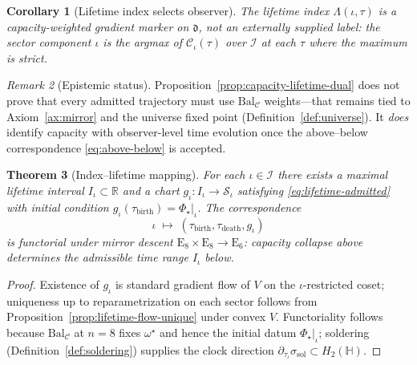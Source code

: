 \documentclass[aps,prd,onecolumn,amsmath,amssymb,nofootinbib,11pt]{revtex4-2}
\numberwithin{equation}{section}
\theoremstyle{plain}
\newtheorem{theorem}{Theorem}[section]
\newtheorem{corollary}[theorem]{Corollary}
\theoremstyle{definition}
\theoremstyle{remark}
\newtheorem{remark}[theorem]{Remark}
\newcommand{\Quat}{\mathbb{H}}
\newcommand{\E}[1]{\mathrm{E}_{#1}}
\newcommand{\capacity}{\mathcal{C}}
\newcommand{\orderparam}{\Phi}
\begin{document}
\begin{corollary}[Lifetime index selects observer]\label{cor:iota-lambda}
The lifetime index $\Lambda(\iota,\tau)$ is a capacity-weighted gradient marker
on $\mathfrak{d}$, not an externally supplied label: the sector component
$\iota$ is the argmax of $\capacity_\iota(\tau)$ over $\mathcal{I}$ at each
$\tau$ where the maximum is strict.
\end{corollary}

\begin{remark}[Epistemic status]
Proposition~\ref{prop:capacity-lifetime-dual} does not prove that every
admitted trajectory must use $\mathrm{Bal}_{\mathcal{C}}$ weights---that
remains tied to Axiom~\ref{ax:mirror} and the universe fixed point
(Definition~\ref{def:universe}). It \emph{does} identify capacity with
observer-level time evolution once the above--below correspondence
\eqref{eq:above-below} is accepted.
\end{remark}

\begin{theorem}[Index--lifetime mapping]\label{thm:index-lifetime}
For each $\iota\in\mathcal{I}$ there exists a maximal lifetime interval
$I_\iota\subset\mathbb{R}$ and a chart $g_\iota:I_\iota\to\mathcal{S}_\iota$
satisfying \eqref{eq:lifetime-admitted} with initial condition
$g_\iota(\tau_{\mathrm{birth}})=\orderparam_\star|_\iota$.
The correspondence
\begin{equation}\label{eq:index-lifetime-bij}
  \iota \;\longmapsto\; (\tau_\mathrm{birth},\tau_\mathrm{death},g_\iota)
\end{equation}
is functorial under mirror descent $\E{8}\times\E{8}\to\E{6}$: capacity
collapse above determines the admissible time range $I_\iota$ below.
\end{theorem}

\begin{proof}
Existence of $g_\iota$ is standard gradient flow of $V$ on the
$\iota$-restricted coset; uniqueness up to reparametrization on each sector
follows from Proposition~\ref{prop:lifetime-flow-unique} under convex $V$.
Functoriality follows because
$\mathrm{Bal}_{\mathcal{C}}$ at $n=8$ fixes $\omega^\star$ and hence the
initial datum $\orderparam_\star|_\iota$; soldering
(Definition~\ref{def:soldering}) supplies the clock direction
$\partial_{\tau_\iota}\sigma_{\mathrm{sol}}\subset H_2(\Quat)$.
\end{proof}
\end{document}
